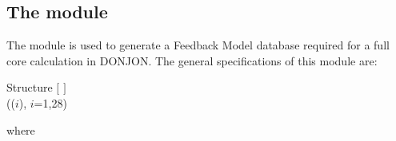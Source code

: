 \subsection{The  module}\label{sect:CFCData}

The  module is used to generate a Feedback Model database required for a full core
calculation in DONJON.\cite{sissaoui} The general
specifications of this module are:

\begin{DataStructure}{Structure }
 \moc{:=}  $[$  $]$ \\
\hspace*{1.0cm} (($i$), $i$=1,28) \moc{::} 
\end{DataStructure}

\noindent 
 where

